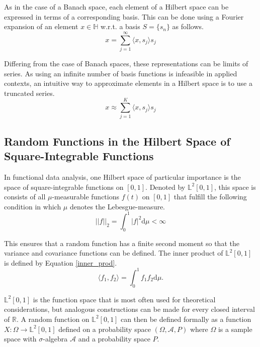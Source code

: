 \documentclass[11pt,twoside,a4paper]{article}
\begin{document}
	As in the case of a Banach space, each element of a Hilbert space can be expressed in terms of a corresponding basis. This can be done using a Fourier expansion of an element $x \in \mathbb{H}$ w.r.t. a basis $S = \{s_n\}$ as follows.
	\begin{equation}
		x = \sum_{j = 1}^{\infty}{\langle x, s_j \rangle}s_j
	\end{equation}
	
	Differing from the case of Banach spaces, these representations can be limits of series. As using an infinite number of basis functions is infeasible in applied contexts, an intuitive way to approximate elements in a Hilbert space is to use a truncated series.
	\begin{equation}
		x \approx \sum_{j = 1}^{K}{\langle x, s_j \rangle}s_j
	\end{equation}
	
	\subsection{Random Functions in the Hilbert Space of Square-Integrable Functions}
	In functional data analysis, one Hilbert space of particular importance is the space of square-integrable functions on $[0,1]$. Denoted by $\mathbb{L}^2[0,1]$, this space is consists of all $\mu$-measurable functions $f(t)$ on $[0,1]$ that fulfill the following condition in which $\mu$ denotes the Lebesgue-measure.
	\begin{equation}
		\lvert \lvert f \rvert \rvert_2 = \int_{0}^{1} \lvert f \rvert^2 \mathrm{d}\mu < \infty
	\end{equation}
	
	This ensures that a random function has a finite second moment so that the variance and covariance functions can be defined. The inner product of $\mathbb{L}^2[0,1]$ is defined by Equation \ref{inner_prod}.
	\begin{equation}\label{inner_prod}
		\langle f_1, f_2 \rangle = \int_{0}^{1} f_1 f_2 \mathrm{d}\mu.
	\end{equation}
	
	$\mathbb{L}^2[0,1]$ is the function space that is most often used for theoretical considerations, but analogous constructions can be made for every closed interval of $\mathbb{R}$. 
	A random function on $\mathbb{L}^2[0,1]$ can then be defined formally as a function $X : \Omega \rightarrow \mathbb{L}^2[0,1]$ defined on a probability space $(\Omega, \mathcal{A}, P)$ where $\Omega$ is a sample space with $\sigma$-algebra $\mathcal{A}$ and a probability space $P$.
	
\end{document}
